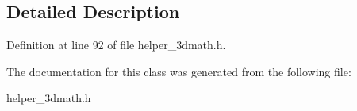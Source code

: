 \subsection{Detailed Description}


Definition at line 92 of file helper\+\_\+3dmath.\+h.



The documentation for this class was generated from the following file\+:\begin{DoxyCompactItemize}
\item 
helper\+\_\+3dmath.\+h\end{DoxyCompactItemize}
